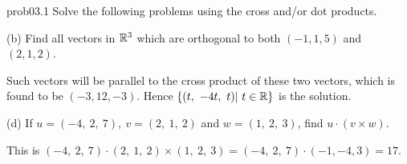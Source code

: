 \begin{sol}{prob03.1}  Solve the following problems using the cross and/or dot products.\medskip
  
 
(b) Find all vectors in $\mathbb{R}^3$ which are orthogonal to both  $(-1, 1, 5)$ and $(2, 1, 2)$.  \medskip

\soln Such vectors will be parallel to the cross product of these two vectors, which is found to be $(-3, 12, -3)$. Hence $\{(t,\ -4t,\ t)|\ t\in \mathbb{R}\}$ is the solution.
 
\medskip

 

(d) If $u=(-4,\ 2,\ 7),\ v=(2,\ 1,\ 2)$ and 
$w=(1,\ 2,\ 3)$, find $u\cdot (v\times w)$. \medskip

\soln This is $(-4,\ 2,\ 7)\cdot (2,\ 1,\ 2)\times (1,\ 2,\ 3)= (-4,\ 2,\ 7)\cdot (-1, -4, 3)=17$.
 \end{sol}
 
